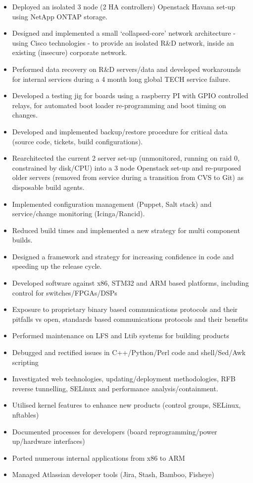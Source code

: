 \begin{itemize}
\item
  Deployed an isolated 3 node (2 HA controllers) Openstack Havana set-up
  using NetApp ONTAP storage.
\item
  Designed and implemented a small `collapsed-core' network architecture
  - using Cisco technologies - to provide an isolated R\&D network,
  inside an existing (insecure) corporate network.
\item
  Performed data recovery on R\&D servers/data and developed workarounds
  for internal services during a 4 month long global TECH service
  failure.
\item
  Developed a testing jig for boards using a raspberry PI with GPIO
  controlled relays, for automated boot loader re-programming and boot
  timing on changes.
\item
  Developed and implemented backup/restore procedure for critical data
  (source code, tickets, build configurations).
\item
  Rearchitected the current 2 server set-up (unmonitored, running on
  raid 0, constrained by disk/CPU) into a 3 node Openstack set-up and
  re-purposed older servers (removed from service during a transition
  from CVS to Git) as disposable build agents.
\item
  Implemented configuration management (Puppet, Salt stack) and
  service/change monitoring (Icinga/Rancid).
\item
  Reduced build times and implemented a new strategy for multi component
  builds.
\item
  Designed a framework and strategy for increasing confidence in code
  and speeding up the release cycle.
\item
  Developed software against x86, STM32 and ARM based platforms,
  including control for switches/FPGAs/DSPs
\item
  Exposure to proprietary binary based communications protocols and
  their pitfalls vs open, standards based communications protocols and
  their benefits
\item
  Performed maintenance on LFS and Ltib systems for building products
\item
  Debugged and rectified issues in C++/Python/Perl code and
  shell/Sed/Awk scripting
\item
  Investigated web technologies, updating/deployment methodologies, RFB
  reverse tunnelling, SELinux and performance analysis/containment.
\item
  Utilised kernel features to enhance new products (control groups,
  SELinux, nftables)
\item
  Documented processes for developers (board reprogramming/power
  up/hardware interfaces)
\item
  Ported numerous internal applications from x86 to ARM
\item
  Managed Atlassian developer tools (Jira, Stash, Bamboo, Fisheye)
\end{itemize}

